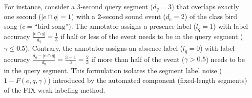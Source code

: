 For instance, consider a 3-second query segment ($d_q = 3$) that overlaps exactly one second ($|e \cap q|=1$) with a 2-second sound event ($d_e = 2$) of the class bird song  $(c=\text{``bird song''}$). The annotator assigns a presence label ($l_q = 1$) with label accuracy \( \frac{|e \cap q|}{d_q} = \frac{1}{3} \) if half or less of the event needs to be in the query segment ($\gamma \leq 0.5$). Contrary, the annotator assigns an absence label (\(l_q = 0\)) with label accuracy \( \frac{d_q - |e \cap q|}{d_q} = \frac{3 - 1}{3} = \frac{2}{3} \) if more than half of the event ($\gamma > 0.5$) needs to be in the query segment. This formulation isolates the segment label noise (\( 1 - F(e, q, \gamma) \)) introduced by the automated component (fixed-length segments) of the FIX weak labeling method.

